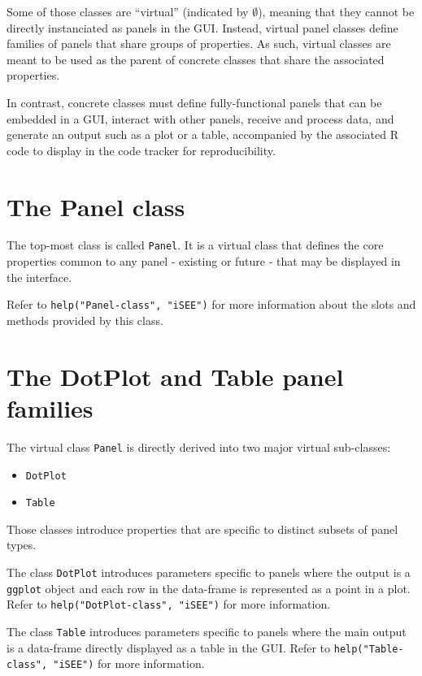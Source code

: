 \documentclass[]{book}
\providecommand{\tightlist}{%
  \setlength{\itemsep}{0pt}\setlength{\parskip}{0pt}}
\begin{document}
Some of those classes are ``virtual'' (indicated by \(\emptyset\)),
meaning that they cannot be directly instanciated as panels in the GUI.
Instead, virtual panel classes define families of panels that share
groups of properties. As such, virtual classes are meant to be used as
the parent of concrete classes that share the associated properties.

In contrast, concrete classes must define fully-functional panels that
can be embedded in a GUI, interact with other panels, receive and
process data, and generate an output such as a plot or a table,
accompanied by the associated R code to display in the code tracker for
reproducibility.

\section{The Panel class}\label{the-panel-class}

The top-most class is called \texttt{Panel}. It is a virtual class that
defines the core properties common to any panel - existing or future -
that may be displayed in the interface.

Refer to \texttt{help("Panel-class",\ "iSEE")} for more information
about the slots and methods provided by this class.

\section{The DotPlot and Table panel
families}\label{the-dotplot-and-table-panel-families}

The virtual class \texttt{Panel} is directly derived into two major
virtual sub-classes:

\begin{itemize}
\tightlist
\item
  \texttt{DotPlot}
\item
  \texttt{Table}
\end{itemize}

Those classes introduce properties that are specific to distinct subsets
of panel types.

The class \texttt{DotPlot} introduces parameters specific to panels
where the output is a \texttt{ggplot} object and each row in the
data-frame is represented as a point in a plot. Refer to
\texttt{help("DotPlot-class",\ "iSEE")} for more information.

The class \texttt{Table} introduces parameters specific to panels where
the main output is a data-frame directly displayed as a table in the
GUI. Refer to \texttt{help("Table-class",\ "iSEE")} for more
information.
\end{document}
